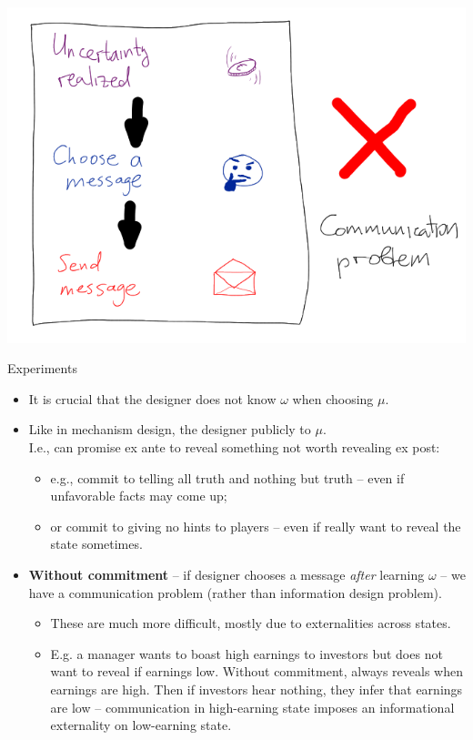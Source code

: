 \documentclass[english,10pt
,aspectratio=169
]{beamer}
\begin{document}
\begin{frame}
	\centering
	\includegraphics[scale=0.7]{pics/M7/timing2}
\end{frame}


\begin{frame}{Experiments}
\begin{itemize}
	\item It is crucial that the designer \alert{does not know $\omega$} when choosing $\mu$.
	\item Like in mechanism design, the designer publicly  to $\mu$. 
	\\ I.e., can promise ex ante to reveal something not worth revealing ex post:
	\begin{itemize}
		\item e.g., commit to telling all truth and nothing but truth -- even if unfavorable facts may come up;
		\item or commit to giving no hints to players -- even if really want to reveal the state sometimes.
	\end{itemize}
	\item \textbf{Without commitment} -- if designer chooses a message \emph{after} learning $\omega$ -- we have a \alert{communication problem} (rather than information design problem).
	\begin{itemize}
		\item These are much more difficult, mostly due to externalities across states.
		\item E.g. a manager wants to boast high earnings to investors but does not want to reveal if earnings low. Without commitment, always reveals when earnings are high. Then if investors hear nothing, they infer that earnings are low -- communication in high-earning state imposes an informational externality on low-earning state.
	\end{itemize}
\end{itemize}
\end{frame}
\end{document}

